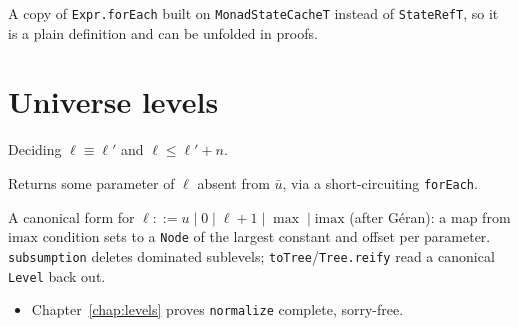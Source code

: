 \begin{definition}
\label{def:kernel-foreach-exprv}
\leanok
{} A copy of \texttt{Expr.forEach} built on \texttt{MonadStateCacheT} instead of
\texttt{StateRefT}, so it is a plain definition and can be unfolded in proofs.
\end{definition}

\section{Universe levels}

Deciding $\ell \equiv \ell'$ and $\ell \le \ell' + n$.

\begin{definition}
\label{def:kernel-level-getundefparam}
\leanok
{}

 Returns some parameter of $\ell$ absent from $\bar u$, via a short-circuiting
\texttt{forEach}.
\end{definition}

\begin{definition}
\label{def:kernel-level-normalize}
\leanok
{}

 A canonical form for $\ell ::= u \mid 0 \mid \ell+1 \mid \max \mid \mathrm{imax}$
(after G\'eran): a map from $\mathrm{imax}$ condition sets to a \texttt{Node} of the largest
constant and offset per parameter. \texttt{subsumption} deletes dominated sublevels;
\texttt{toTree}/\texttt{Tree.reify} read a canonical \texttt{Level} back out.
\begin{itemize}
\item {} Chapter~\ref{chap:levels} proves \texttt{normalize} complete, sorry-free.
\end{itemize}
\end{definition}

